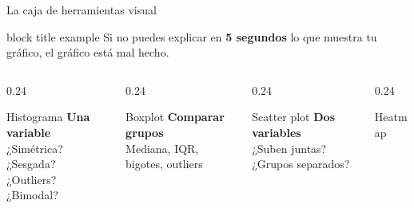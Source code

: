 \documentclass[aspectratio=169,10pt]{beamer}
\begin{document}
\begin{frame}{La caja de herramientas visual}
  \begin{center}
    \begin{beamercolorbox}[sep=8pt,center,rounded=true]{block title example}
      \large Si no puedes explicar en \textbf{5 segundos} lo que muestra tu gráfico,
      el gráfico está mal hecho.
    \end{beamercolorbox}
  \end{center}
  \vspace{0.5mm}
  \begin{columns}[T]
    \begin{column}{0.24\textwidth}
      \begin{block}{\centering Histograma}
        \centering\scriptsize\vspace{1mm}
        \textbf{Una variable}\\[2mm]
        ¿Simétrica?\\¿Sesgada?\\¿Outliers?\\¿Bimodal?
        \vspace{1mm}
      \end{block}
    \end{column}
    \begin{column}{0.24\textwidth}
      \begin{block}{\centering Boxplot}
        \centering\scriptsize\vspace{1mm}
        \textbf{Comparar grupos}\\[2mm]
        Mediana, IQR,\\bigotes, outliers
        \vspace{1mm}
      \end{block}
    \end{column}
    \begin{column}{0.24\textwidth}
      \begin{block}{\centering Scatter plot}
        \centering\scriptsize\vspace{1mm}
        \textbf{Dos variables}\\[2mm]
        ¿Suben juntas?\\¿Grupos separados?
        \vspace{1mm}
      \end{block}
    \end{column}
    \begin{column}{0.24\textwidth}
      \begin{block}{\centering Heatmap}

\end{block}
\end{column}
\end{columns}
\end{frame}
\end{document}
